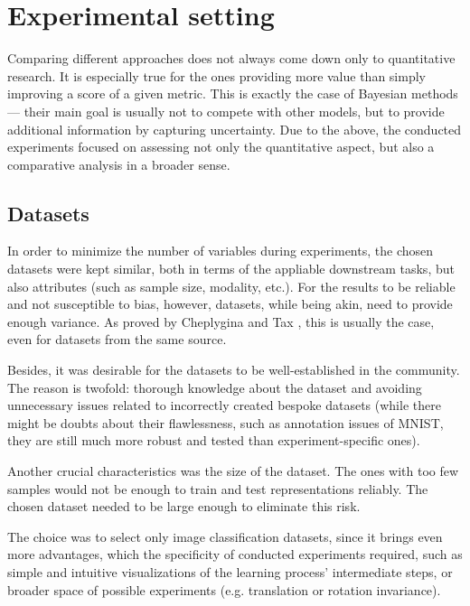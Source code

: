 \chapter{Experimental setting}\label{chapter:experiments}
\thispagestyle{chapterBeginStyle}
Comparing different approaches does not always come down only to quantitative research. It is especially true for the ones providing more value than simply improving a score of a given metric. This is exactly the case of Bayesian methods — their main goal is usually not to compete with other models, but to provide additional information by capturing uncertainty. Due to the above, the conducted experiments focused on assessing not only the quantitative aspect, but also a comparative analysis in a broader sense.

\section{Datasets}\label{sec:datasets}
In order to minimize the number of variables during experiments, the chosen datasets were kept similar, both in terms of the appliable downstream tasks, but also attributes (such as sample size, modality, etc.). For the results to be reliable and not susceptible to bias, however, datasets, while being akin, need to provide enough variance. As proved by Cheplygina and Tax \cite{Cheplygina2018}, this is usually the case, even for datasets from the same source.

\vspace{\baselineskip}
Besides, it was desirable for the datasets to be well-established in the community. The reason is twofold: thorough knowledge about the dataset and avoiding unnecessary issues related to incorrectly created bespoke datasets (while there might be doubts about their flawlessness, such as annotation issues of MNIST, they are still much more robust and tested than experiment-specific ones).

\vspace{\baselineskip}
Another crucial characteristics was the size of the dataset. The ones with too few samples would not be enough to train and test representations reliably. The chosen dataset needed to be large enough to eliminate this risk.



\vspace{\baselineskip}
The choice was to select only image classification datasets, since it brings even more advantages, which the specificity of conducted experiments required, such as simple and intuitive visualizations of the learning process' intermediate steps, or broader space of possible experiments (e.g. translation or rotation invariance).

